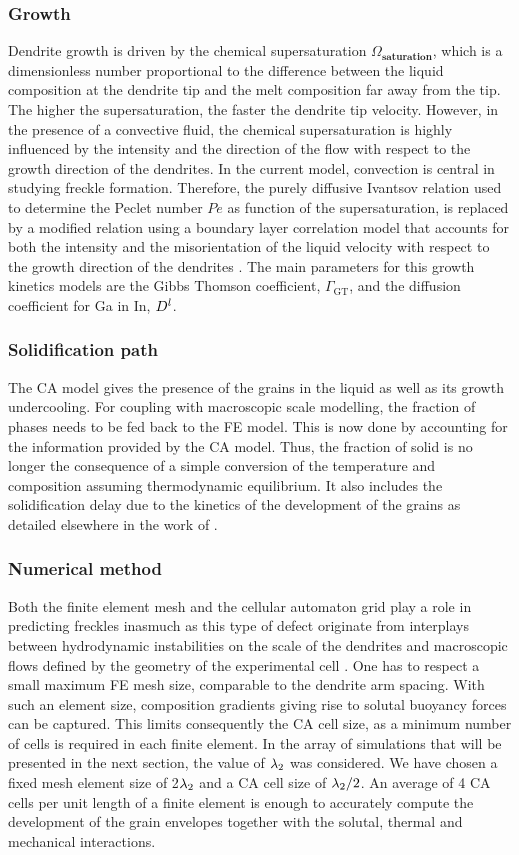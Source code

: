 \subsubsection{Growth}
Dendrite growth is driven by the chemical supersaturation $\Omega_\textbf{saturation}$, which is a 
dimensionless number proportional to the difference between the liquid composition at the dendrite 
tip and the melt composition far away from the tip. The higher the supersaturation, the faster the 
dendrite tip velocity. However, in the presence of a convective fluid, the chemical supersaturation 
is highly influenced by the intensity and the direction of the flow with respect to the growth direction 
of the dendrites. In the current model, convection is central in studying freckle formation. Therefore, 
the purely diffusive Ivantsov relation used to determine the Peclet number $Pe$ as function of the supersaturation, 
is replaced by a modified relation using a boundary layer correlation model that accounts for both the intensity 
and the misorientation of the liquid velocity with respect to the growth direction of the dendrites \citep{gandin_boundary_2003}. 
The main parameters for this growth kinetics models are the Gibbs Thomson coefficient, $\Gamma_{\text{GT}}$, and the diffusion 
coefficient for Ga in In, $D^l$.
%
\subsubsection{Solidification path}
The CA model gives the presence of the grains in the liquid as well as its growth undercooling. 
For coupling with macroscopic scale modelling, the fraction of phases needs to be fed back to the 
FE model. This is now done by accounting for the information provided by the CA model. Thus, the 
fraction of solid is no longer the consequence of a simple conversion of the temperature and 
composition assuming thermodynamic equilibrium. It also includes the solidification delay due to 
the kinetics of the development of the grains as detailed elsewhere in the work of \citet{carozzani_direct_2013}.
%
\subsubsection{Numerical method}
Both the finite element mesh and the cellular automaton grid play a role in predicting freckles inasmuch as 
this type of defect originate from interplays between hydrodynamic instabilities on the scale of the dendrites 
and macroscopic flows defined by the geometry of the experimental cell \citep{shevchenko_chimney_2013}. One has to 
respect a small maximum FE mesh size, comparable to the dendrite arm spacing. With such an element size, composition gradients giving 
rise to solutal buoyancy forces can be captured. This limits consequently the CA cell size, as a minimum number 
of cells is required in each finite element. In the array of simulations that will be presented in the next section, 
the value of ${\lambda}_{2}$ was considered. We have chosen a fixed mesh element size of 2${\lambda}_{2}$ and a CA cell size of ${\lambda}_{2}/2$. 
An average of 4 CA cells per unit length of a finite element is enough to accurately compute the development of the 
grain envelopes together with the solutal, thermal and mechanical interactions.
%
